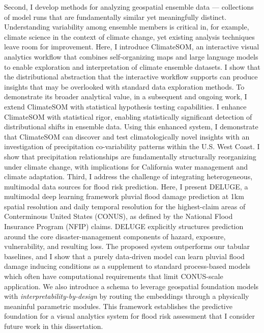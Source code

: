 Second, I develop methods for analyzing geospatial ensemble data — collections of model runs that are fundamentally similar yet meaningfully distinct. Understanding variability among ensemble members is critical in, for example, climate science in the context of climate change, yet existing analysis techniques leave room for improvement. Here, I introduce ClimateSOM, an interactive visual analytics workflow that combines self-organizing maps and large language models to enable exploration and
interpretation of climate ensemble datasets. I show that the distributional abstraction that the interactive workflow supports can produce insights that may be overlooked with standard data exploration methods. To demonstrate its broader analytical value, in a subsequent and ongoing work, I extend ClimateSOM with statistical hypothesis testing capabilities. I enhance ClimateSOM with statistical rigor, enabling statistically significant detection of distributional shifts in ensemble data. Using this enhanced system, I demonstrate that ClimateSOM can discover and test climatologically novel insights with an investigation of precipitation co-variability patterns within the U.S. West Coast. I show that precipitation relationships are fundamentally structurally reorganizing under climate change, with implications for California water management and climate adaptation. Third, I address the challenge of integrating heterogeneous, multimodal data sources for flood risk prediction. Here, I present DELUGE, a multimodal deep learning framework pluvial flood damage prediction at 1km spatial resolution and daily temporal resolution for the highest-claim areas of Conterminous United States (CONUS), as defined by the National Flood Insurance Program (NFIP) claims.
%
DELUGE explicitly structures prediction around the core disaster-management components of hazard, exposure, vulnerability, and resulting loss.
%
The proposed system outperforms our tabular baselines, and I show that a purely data-driven model can learn pluvial flood damage inducing conditions as a supplement to standard process-based models which often have computational requirements that limit CONUS-scale application. We also introduce a schema to leverage geospatial foundation models with \emph{interpretability-by-design} by routing the embeddings through a physically meaninful parametric modules. This framework establishes the predictive foundation for a visual analytics system for flood risk assessment that I consider future work in this dissertation.

